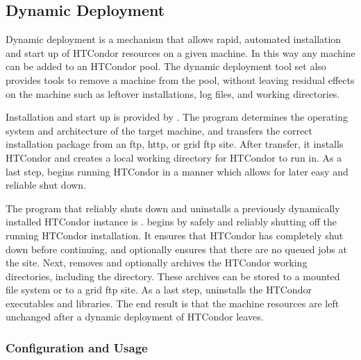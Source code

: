 \subsection{\label{sec:Dynamic-Deployment}Dynamic Deployment}

Dynamic deployment is a mechanism that allows rapid, automated
installation and start up of HTCondor resources on a given machine.
In this way any machine can be added to an HTCondor pool.
The dynamic
deployment tool set also provides tools to remove a machine from the
pool, without leaving residual effects on the machine such as leftover
installations, log files, and working directories.

Installation and start up is provided by .
The  program determines the operating system and
architecture of the target machine, and transfers the correct
installation package from an ftp, http, or grid ftp site.
After transfer, it
installs HTCondor and creates a local working
directory for HTCondor to run in.  As a last step, 
begins running HTCondor in a manner which allows for later easy and reliable
shut down.

The program that reliably shuts down and uninstalls a previously
dynamically installed HTCondor instance is .
 begins by safely and reliably shutting off the
running HTCondor installation.  It ensures that HTCondor has
completely shut down before continuing, and optionally ensures that
there are no queued jobs at the site.
Next, 
removes and optionally archives the HTCondor working directories,
including the  directory. 
These archives can be stored to a
mounted file system or to a grid ftp site.
As a last step,
 uninstalls the HTCondor executables and libraries.
The end result is that the machine resources are left unchanged after
a dynamic deployment of HTCondor leaves.

\subsubsection{Configuration and Usage}

